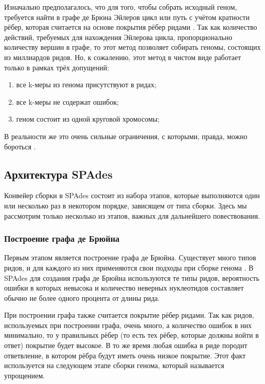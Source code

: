\documentclass[14pt]{matmex-diploma-custom}
\begin{document}
Изначально предполагалось, что для того, чтобы собрать исходный геном, требуется найти в графе де Брюна Эйлеров цикл или путь с учётом кратности рёбер, которая считается на основе покрытия рёбер ридами \cite{art:disser_andrey}. Так как количество действий, требуемых для нахождения Эйлерова цикла, пропорционально количеству вершин в графе, то этот метод позволяет собирать геномы, состоящих из миллиардов ридов. Но, к сожалению, этот метод в чистом виде работает только в рамках трёх допущений:
\begin{enumerate}
    \item все k-меры из генома присутствуют в ридах;
    \item все k-меры не содержат ошибок;
    \item геном состоит из одной круговой хромосомы;
\end{enumerate}

В реальности же это очень сильные ограничения, с которыми, правда, можно бороться \cite{art:Compeau}.

\subsection{Архитектура SPAdes}
Конвейер сборки в SPAdes состоит из набора этапов, которые выполняются один или несколько раз в некотором порядке, зависящем от типа сборки. Здесь мы рассмотрим только несколько из этапов, важных для дальнейшего повествования.

\subsubsection{Построение графа де Брюйна}

Первым этапом является построение графа де Брюйна. Существует много типов ридов, и для каждого из них применяются свои подходы при сборке генома \cite{art:ex:Ghurye2, art:ex:Chaisson, art:ex:Sedlazeck, art:ex:Ghurye1}.
В SPAdes для создания графа де Брюйна используются те типы ридов, вероятность ошибки в которых невысока и количество неверных нуклеотидов составляет обычно не более одного процента от длины рида.

При построении графа также считается покрытие рёбер ридами. Так как ридов, используемых при построении графа, очень много, а количество ошибок в них минимально, то у правильных рёбер (то есть тех рёбер, которые должны войти в ответ) покрытие будет высокое. В то же время любая ошибка в риде породит ответвление, в котором рёбра будут иметь очень низкое покрытие. Этот факт используется на следующем этапе сборки генома, который называется упрощением.
\end{document}
